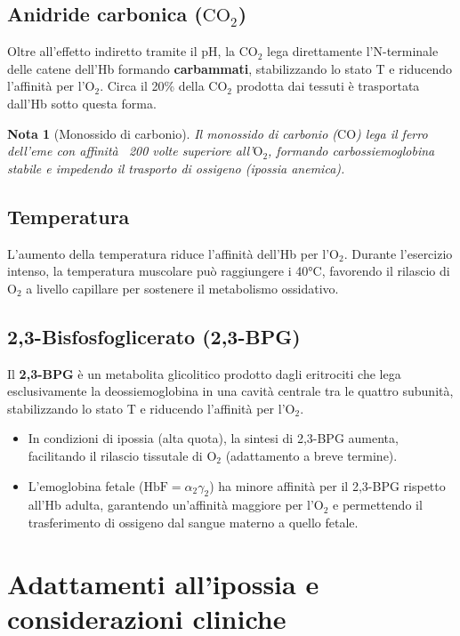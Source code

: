 \documentclass[12pt,a4paper]{report}
\newtheorem{nota}{Nota}[section]
\begin{document}
\subsection{Anidride carbonica (\(\mathrm{CO_2}\))}
Oltre all'effetto indiretto tramite il pH, la \(\mathrm{CO_2}\) lega direttamente l'N-terminale delle catene dell'Hb formando \textbf{carbammati}, stabilizzando lo stato T e riducendo l'affinità per l'\(\mathrm{O_2}\). Circa il 20\% della \(\mathrm{CO_2}\) prodotta dai tessuti è trasportata dall'Hb sotto questa forma.
\begin{nota}[Monossido di carbonio]
Il monossido di carbonio (\(\mathrm{CO}\)) lega il ferro dell'eme con affinità ~200 volte superiore all'\(\mathrm{O_2}\), formando carbossiemoglobina stabile e impedendo il trasporto di ossigeno (ipossia anemica).
\end{nota}

\subsection{Temperatura}
L'aumento della temperatura riduce l'affinità dell'Hb per l'\(\mathrm{O_2}\). Durante l'esercizio intenso, la temperatura muscolare può raggiungere i 40°C, favorendo il rilascio di \(\mathrm{O_2}\) a livello capillare per sostenere il metabolismo ossidativo.

\subsection{2,3-Bisfosfoglicerato (2,3-BPG)}
Il \textbf{2,3-BPG} è un metabolita glicolitico prodotto dagli eritrociti che lega esclusivamente la deossiemoglobina in una cavità centrale tra le quattro subunità, stabilizzando lo stato T e riducendo l'affinità per l'\(\mathrm{O_2}\).
\begin{itemize}
\item In condizioni di ipossia (alta quota), la sintesi di 2,3-BPG aumenta, facilitando il rilascio tissutale di \(\mathrm{O_2}\) (adattamento a breve termine).
\item L'emoglobina fetale (\(\mathrm{HbF} = \alpha_2\gamma_2\)) ha minore affinità per il 2,3-BPG rispetto all'Hb adulta, garantendo un'affinità maggiore per l'\(\mathrm{O_2}\) e permettendo il trasferimento di ossigeno dal sangue materno a quello fetale.
\end{itemize}

\section{Adattamenti all'ipossia e considerazioni cliniche}
\end{document}
